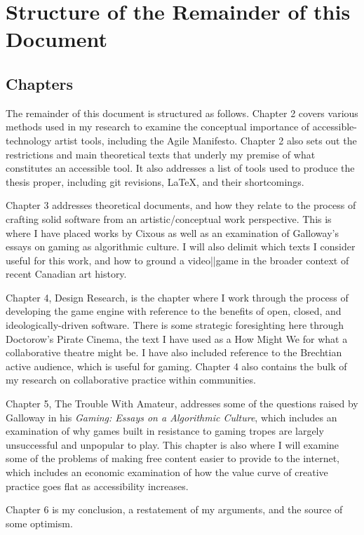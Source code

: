 \section{Structure of the Remainder of this Document}

\subsection{Chapters}
The remainder of this document is structured as follows. Chapter 2 covers various methods used in my research to examine the conceptual importance of accessible-technology artist tools, including the Agile Manifesto. Chapter 2 also sets out the restrictions and main theoretical texts that underly my premise of what constitutes an accessible tool. It also addresses a list of tools used to produce the thesis proper, including git revisions, LaTeX, and their shortcomings. 

Chapter 3 addresses theoretical documents, and how they relate to the process of crafting solid software from an artistic/conceptual work perspective. This is where I have placed works by Cixous as well as an examination of Galloway's essays on gaming as algorithmic culture. I will also delimit which texts I consider useful for this work, and how to ground a video||game in the broader context of recent Canadian art history.

Chapter 4, Design Research, is the chapter where I work through the process of developing the game engine with reference to the benefits of open, closed, and ideologically-driven software. There is some strategic foresighting here through Doctorow's Pirate Cinema, the text I have used as a How Might We for what a collaborative theatre might be. I have also included reference to the Brechtian active audience, which is useful for gaming. Chapter 4 also contains the bulk of my research on collaborative practice within communities.

Chapter 5, The Trouble With Amateur, addresses some of the questions raised by Galloway in his \textit{Gaming: Essays on a Algorithmic Culture}, which includes an examination of why games built in resistance to gaming tropes are largely unsuccessful and unpopular to play. This chapter is also where I will examine some of the problems of making free content easier to provide to the internet, which includes an economic examination of how the value curve of creative practice goes flat as accessibility increases.

Chapter 6 is my conclusion, a restatement of my arguments, and the source of some optimism.

